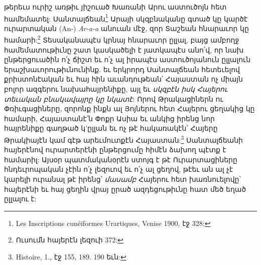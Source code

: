 \documentclass{article}
\begin{document}
{թերեւս ուրիշ առթիւ յիշուած Խառանի Արու աստուծոյն հետ համեմատել: Սանտալճեան\footnote{Les Inscriptions cunéiformes Urartiques, Venise 1900, էջ 328:} Արայի սկզբնականը գտած կը կարծէ ուրարտական (An-) \emph{Ar-a-a} անուան մէջ, զոր Տաշեան հնարաւոր կը համարի:\footnote{Ուսումն հայերէն լեզուի 372:} Տեսականապէս կրնայ հնարաւոր ըլլալ, բայց ամբողջ համեմատութիւնը շատ կասկածելի է յատկապէս անո՛վ, որ նախ ընթերցուածին ո՛չ ճիշտ եւ ո՛չ ալ իրապէս աստուծոյանուն ըլլալուն երաշխաւորութիւնունինք. եւ երկրորդ Սանտալճեան հետեւելով քրիստոնէական եւ հայ հին աւանդութեան՝ Հայաստան ոչ միայն բոլոր ազգերու նախահայրենիքը, այլ եւ \emph{սկզբէն իսկ Հայերու տեւական բնակավայրը կը նկատէ}: Որով Թրակացիներն ու Փռիւգացիները, զորոնք ինքն ալ Յոյներու հետ Հայերու ցեղակից կը համարի, Հայաստանէ՛ն Փոքր Ասիա եւ անկից իրենց նոր հայրենիքը գաղթած կ'ըլլան եւ ոչ թէ հակառակէն՝ Հայերը Թրակիայէն կամ գէթ արեւմուտքէն Հայաստան:\footnote{Histoire, 1., էջ 155, 189. 190 եւն:} Սանտալճեանի հայերէնով ուրարտերէնի ընթերցումը հիմէն ձախող պէտք է համարիլ: Այսօր պատմականօրէն ստոյգ է թէ Ուրարտացիները հնդեւրոպական չէին ո՛չ լեզուով եւ ո՛չ ալ ցեղով, թէեւ ան ալ չէ կարելի ուրանալ թէ իրենց՝ \emph{մասամբ} Հայերու հետ խառնուելովը՝ հայերէնի եւ հայ ցեղին վրայ ըրած ազդեցութիւնը հատ մեծ եղած ըլլալու է:

}
\end{document}
